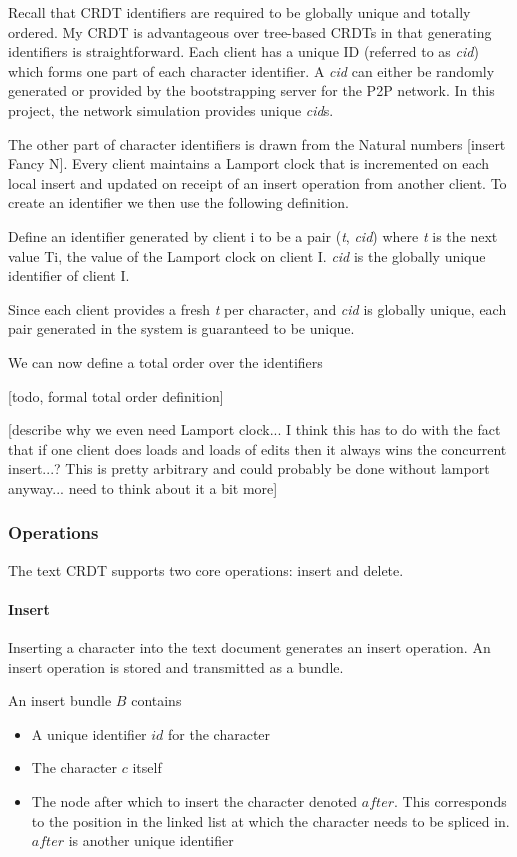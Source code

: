 \documentclass[12pt,a4paper,twoside,openright]{report}
\begin{document}
		Recall that CRDT identifiers are required to be globally unique and totally ordered. My CRDT is advantageous over tree-based CRDTs in that generating identifiers is straightforward. Each client has a unique ID (referred to as \textit{cid}) which forms one part of each character identifier. A \textit{cid} can either be randomly generated or provided by the bootstrapping server for the P2P network. In this project, the network simulation provides unique \textit{cid}s.
		
		The other part of character identifiers is drawn from the Natural numbers [insert Fancy N]. Every client maintains a Lamport \cite{lamport1978} clock that is incremented on each local insert and updated on receipt of an insert operation from another client. To create an identifier we then use the following definition.
		
		Define an identifier generated by client i to be a pair (\textit{t}, \textit{cid}) where \textit{t} is the next value Ti, the value of the Lamport clock on client I. \textit{cid} is the globally unique identifier of client I.
		
		Since each client provides a fresh \textit{t} per character, and \textit{cid} is globally unique, each pair generated in the system is guaranteed to be unique.
		
		We can now define a total order over the identifiers
		
		[todo, formal total order definition]
		
		[describe why we even need Lamport clock... I think this has to do with the fact that if one client does loads and loads of edits then it always wins the concurrent insert...? This is pretty arbitrary and could probably be done without lamport anyway... need to think about it a bit more]
		
		
		\subsubsection{Operations}
		The text CRDT supports two core operations: insert and delete.
		
			\paragraph{Insert}
				Inserting a character into the text document generates an insert operation. An insert operation is stored and transmitted as a bundle.
				
				An insert bundle $B$ contains
				\begin{itemize}
					\item A unique identifier $id$ for the character
					\item The character $c$ itself
					\item The node after which to insert the character denoted $after$. This corresponds to the position in the linked list at which the character needs to be spliced in. $after$ is another unique identifier
				
				\end{itemize}
				
\end{document}
